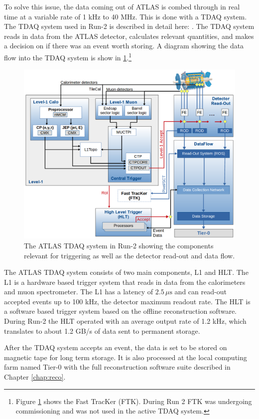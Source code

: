 		To solve this issue, the data coming out of \gls{ATLAS} is combed through in real time at a variable rate of 1 kHz to 40 MHz. This is done with a \gls{TDAQ} system. The \gls{TDAQ} system used in Run-2 is described in detail here: \cite{ATLAS-trigger-Run2}. The \gls{TDAQ} system reads in data from the \gls{ATLAS} detector, calculates relevant quantities, and makes a decision on if there was an event worth storing. A diagram showing the data flow into the \gls{TDAQ} system is show in \ref{fig:trigger-run2}.\footnote{Figure \ref{fig:trigger-run2} shows the Fast TracKer (FTK). During Run 2 FTK was undergoing commissioning and was not used in the active \gls{TDAQ} system.} 
		\begin{figure}[!ht]
		\centering
		\includegraphics[width=\textwidth,keepaspectratio=true]{chapters/chapter3_experiment/images/tdaq-run2-schematic2017.png}
		\caption{The \gls{ATLAS} \gls{TDAQ} system in Run-2 showing the components relevant for triggering as well as the detector read-out and data flow. \cite{TDAQ_Diagram}}
		\label{fig:trigger-run2}
		\end{figure}
		The \gls{ATLAS} \gls{TDAQ} system consists of two main components, \gls{L1} and \gls{HLT}. The \gls{L1} is a hardware based trigger system that reads in data from the calorimeters and muon spectrometer. The \gls{L1} has a latency of $2.5 \, \mu \mathrm{s}$ and can read-out accepted events up to 100 kHz, the detector maximum readout rate. The \gls{HLT} is a software based trigger system based on the offline reconstruction software. During Run-2 the \gls{HLT} operated with an average output rate of 1.2 kHz, which translates to about 1.2 GB/s of data sent to permanent storage.	

		After the \gls{TDAQ} system accepts an event, the data is set to be stored on magnetic tape for long term storage. It is also processed at the local computing farm named Tier-0 with the full reconstruction software suite described in Chapter \ref{chap:reco}.

